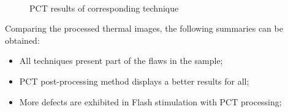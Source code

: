 \documentclass[]{spie}  %
\begin{document}
\begin{figure}[ht]
{      }    
    \\ %
    \hspace{10pt}
    \caption{PCT results of corresponding technique}
    \label{PCT_results}
\end{figure}


Comparing the processed thermal images, the following summaries can be obtained:  
\begin{itemize}
    \item All techniques present part of the flaws in the sample;
    \item PCT post-processing method displays a better results for all;
    \item More defects are exhibited in Flash stimulation with PCT processing;
\end{itemize}
\end{document}
